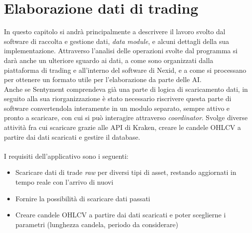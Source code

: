 \documentclass[a4paper,12pt]{report}
\begin{document}
\newpage
\chapter{Elaborazione dati di trading}
\label{cap3}
In questo capitolo si andrà principalmente a descrivere il lavoro svolto dal software di raccolta e gestione dati, \textit{data module}, e alcuni dettagli della sua implementazione. Attraverso l'analisi delle operazioni svolte dal programma si darà anche un ulteriore sguardo ai dati, a come sono organizzati dalla piattaforma di trading e all'interno del software di Nexid, e a come si processano per ottenere un formato utile per l'elaborazione da parte delle AI.\\
Anche se Sentyment comprendeva già una parte di logica di scaricamento dati, in seguito alla sua riorganizzazione è stato necessario riscrivere questa parte di software convertendola interamente in un modulo separato, sempre attivo e pronto a scaricare, con cui si può interagire attraverso \textit{coordinator}. Svolge diverse attività fra cui scaricare grazie alle API di Kraken, creare le candele OHLCV a partire dai dati scaricati e gestire il database.\\~\\
I requisiti dell'applicativo sono i seguenti:
\begin{itemize}
	\item Scaricare dati di trade \textit{raw} per diversi tipi di asset, restando aggiornati in tempo reale con l'arrivo di nuovi
	\item Fornire la possibilità di scaricare dati passati
	\item Creare candele OHLCV a partire dai dati scaricati e poter sceglierne i parametri (lunghezza candela, periodo da considerare)
\end{itemize}
\end{document}
